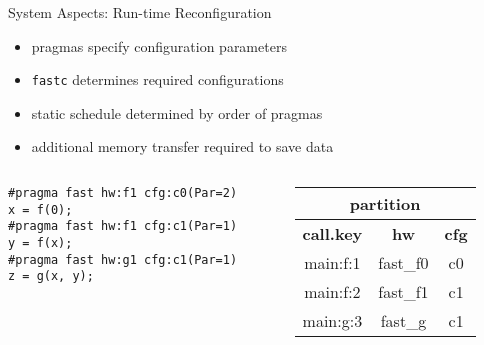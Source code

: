 \begin{frame}[fragile]{System Aspects: Run-time Reconfiguration}
  \begin{itemize}
    \setlength{\itemsep}{8pt}
  \item pragmas specify configuration parameters
  \item \texttt{fastc} determines required configurations
  \item static schedule determined by order of pragmas
  \item additional memory transfer required to save data
\end{itemize}
    \begin{columns}
      \begin{column}{.7\textwidth}
        \begin{center}
          \begin{lstlisting}[style=MaxC]
#pragma fast hw:f1 cfg:c0(Par=2)
x = f(0);
#pragma fast hw:f1 cfg:c1(Par=1)
y = f(x);
#pragma fast hw:g1 cfg:c1(Par=1)
z = g(x, y);
          \end{lstlisting}
        \end{center}
      \end{column}
      \begin{column}{.3\textwidth}
        {\footnotesize
          \begin{table}[!h]
            \renewcommand{\arraystretch}{1.3}
            \hspace{-2cm}
            \begin{tabular}{c|c|c}
              \multicolumn{3}{c}{\bf{partition}} \\
              \hline
              \bf{call.key} & \bf{hw} & \bf{cfg}  \\
              \hline
              main:f:1 & fast\_f0 & c0 \\
              main:f:2 & fast\_f1 & c1 \\
              main:g:3 & fast\_g & c1 \\
            \end{tabular}
          \end{table}
        }
      \end{column}
    \end{columns}

\end{frame}

